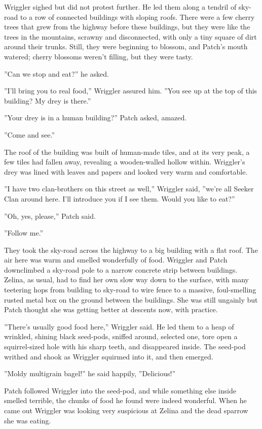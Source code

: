 \documentclass[12pt]{book}
\begin{document}
Wriggler sighed but did not protest further. He led them along a tendril of sky-road to a row of connected buildings with sloping roofs. There were a few cherry trees that grew from the highway before these buildings, but they were like the trees in the mountains, scrawny and disconnected, with only a tiny square of dirt around their trunks. Still, they were beginning to blossom, and Patch's mouth watered; cherry blossoms weren't filling, but they were tasty.

''Can we stop and eat?'' he asked.

''I'll bring you to real food,'' Wriggler assured him. ''You see up at the top of this building? My drey is there.''

''Your drey is in a human building?'' Patch asked, amazed.

''Come and see.''

The roof of the building was built of human-made tiles, and at its very peak, a few tiles had fallen away, revealing a wooden-walled hollow within. Wriggler's drey was lined with leaves and papers and looked very warm and comfortable.

''I have two clan-brothers on this street as well,'' Wriggler said, ''we're all Seeker Clan around here. I'll introduce you if I see them. Would you like to eat?''

''Oh, yes, please,'' Patch said.

''Follow me.''

They took the sky-road across the highway to a big building with a flat roof. The air here was warm and smelled wonderfully of food. Wriggler and Patch downclimbed a sky-road pole to a narrow concrete strip between buildings. Zelina, as usual, had to find her own slow way down to the surface, with many teetering hops from building to sky-road to wire fence to a massive, foul-smelling rusted metal box on the ground between the buildings. She was still ungainly but Patch thought she was getting better at descents now, with practice.

''There's usually good food here,'' Wriggler said. He led them to a heap of wrinkled, shining black seed-pods, sniffed around, selected one, tore open a squirrel-sized hole with his sharp teeth, and disappeared inside. The seed-pod writhed and shook as Wriggler squirmed into it, and then emerged.

''Moldy multigrain bagel!'' he said happily, ''Delicious!''

Patch followed Wriggler into the seed-pod, and while something else inside smelled terrible, the chunks of food he found were indeed wonderful. When he came out Wriggler was looking very suspicious at Zelina and the dead sparrow she was eating.
\end{document}

